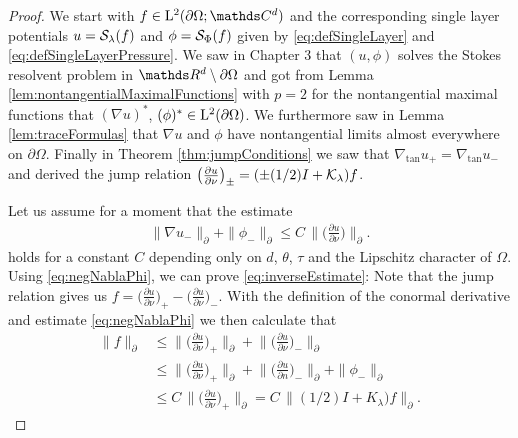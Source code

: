 \begin{proof}
  We start with $f \in \Ell^2(\partial\Omega; \C^d)$ and the corresponding single layer potentials $u = \mathcal{S}_\lambda(f)$ and $\phi = \mathcal{S}_\Phi(f)$ given by \eqref{eq:defSingleLayer} and \eqref{eq:defSingleLayerPressure}.
  We saw in Chapter 3 that $(u,\phi)$ solves the Stokes resolvent problem in $\R^d \setminus \partial\Omega$ and got from Lemma \ref{lem:nontangentialMaximalFunctions} with $p = 2$ for the nontangential maximal functions that $(\nabla u)^*$, $(\phi)^* \in \mathrm{L}^2(\partial\Omega)$.
  We furthermore saw in Lemma \ref{lem:traceFormulas} that $\nabla u$ and $\phi$ have nontangential limits almost everywhere on $\partial\Omega$. 
  Finally in Theorem \ref{thm:jumpConditions} we saw that $\nabla_{\mathrm{tan}} u_+ = \nabla_{\mathrm{tan}} u_-$ and derived the jump relation $\big(\frac{\partial u}{\partial \nu}\big)_\pm = (\pm (1/2) I + \mathcal{K}_\lambda) f$.

  Let us assume for a moment that the estimate
  \begin{align}
    \label{eq:negNablaPhi}
    \| \nabla u_- \|^{}_\partial + \| \phi_- \|^{}_\partial \leq C \, \Big\| \Big( \frac{\partial u}{\partial \nu} \Big) \Big\|^{}_\partial .
  \end{align}
  holds for a constant $C$ depending only on $d$, $\theta$, $\tau$ and the Lipschitz character of $\Omega$. 
  Using \eqref{eq:negNablaPhi}, we can prove \eqref{eq:inverseEstimate}:
  Note that the jump relation gives us $f = \big(\frac{\partial u}{\partial \nu} \big)_+ -  \big( \frac{\partial u}{\partial \nu} \big)_-$.
  With the definition of the conormal derivative and estimate \eqref{eq:negNablaPhi} we then calculate that
  \begin{align*}
    \| f\|^{}_\partial 
    &\leq  \Big\| \Big( \frac{\partial u}{\partial \nu} \Big)_+ \Big\|^{}_\partial + \Big\| \Big( \frac{\partial u}{\partial \nu} \Big)_- \Big\|^{}_\partial  \\
    &\leq \Big\| \Big( \frac{\partial u}{\partial \nu} \Big)_+  \Big\|^{}_\partial + \Big\| \Big( \frac{\partial u}{\partial n} \Big)_- \Big\|^{}_\partial + \| \phi_- \|^{}_\partial  \\
    &\leq C\, \Big\| \Big( \frac{\partial u}{\partial \nu} \Big)_+ \Big\|^{}_\partial
    = C\, \| (1/2)I + K_\lambda) f\|^{}_\partial.
  \end{align*}


\end{proof}
